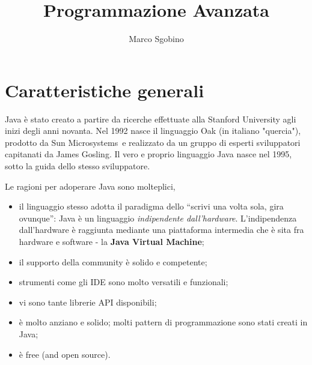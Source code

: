 \documentclass[\fontsizeclass,twocolumn]{\classname}
\let\oldtextsc\textsc
\renewcommand{\textsc}[1]{\oldtextsc{\scfontfs #1}}
\theoremstyle{definition}
\theoremstyle{definition}
\begin{document}
%
\setmainfont{\bodyfont}
\setsansfont{\sansfont}
\setmonofont{\monospacefont}

\title{Programmazione Avanzata}
\author{Marco Sgobino}
\maketitle

\setstretch{\spacingvalue}
\setlength{\emergencystretch}{0pt}
\hfuzz=0pt
\setlength{\headsep}{\headsepvalue}
\setlength{\footskip}{\footskipvalue}
\setlength{\marginparsep}{\marginparsepvalue}
\setlength{\marginparwidth}{\marginparwidthvalue}

\tableofcontents


%

\chapter{Caratteristiche generali}

Java è stato creato a partire da ricerche effettuate alla Stanford University
agli inizi degli anni novanta. Nel 1992 nasce il linguaggio Oak (in italiano
"quercia"), prodotto da Sun Microsystems\texttrademark\  e realizzato da un
gruppo di esperti sviluppatori capitanati da James Gosling. Il vero e proprio
linguaggio Java nasce nel 1995, sotto la guida dello stesso sviluppatore. 

Le ragioni per adoperare Java sono molteplici,

\begin{itemize}
    \item il linguaggio stesso adotta il paradigma dello ``scrivi una volta
        sola, gira ovunque'': Java è un linguaggio \emph{indipendente
        dall'hardware}. L'indipendenza dall'hardware è raggiunta mediante una
        piattaforma intermedia che è sita fra hardware e software \-- la
        \textbf{Java Virtual Machine};
	\item il supporto della community è solido e competente;
	\item strumenti come gli \textsc{IDE} sono molto versatili e funzionali;
	\item vi sono tante librerie API disponibili;
	\item è molto anziano e solido; molti pattern di programmazione sono stati
		creati in Java;
	\item è free (and open source).
\end{itemize}
\end{document}
